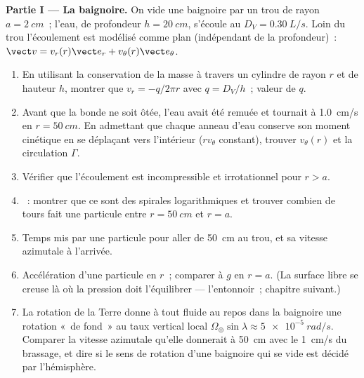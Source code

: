 \begin{problem}
\label{pb:b2:fluid-kinematics:1}

\medskip
\noindent\textbf{Partie I --- La baignoire.}
On vide une baignoire par un trou de rayon $a = \qty{2}{cm}$~; l'eau,
de profondeur $h = \qty{20}{cm}$, s'écoule au  $D_V =
\qty{0.30}{L/s}$. Loin du trou l'écoulement est modélisé comme plan
(indépendant de la profondeur)~: $\vect v = v_r(r)\vect e_r + v_\theta(r)\vect e_\theta$.
\begin{enumerate}
  \item En utilisant la conservation de la masse à travers un cylindre de rayon $r$ et
        de hauteur $h$, montrer que $v_r = -q/2\pi r$ avec $q = D_V/h$~;
        valeur de $q$.
  \item Avant que la bonde ne soit ôtée, l'eau avait été remuée et
        tournait à \qty{1.0}{cm/s} en $r = \qty{50}{cm}$. En admettant que
        chaque anneau d'eau conserve son moment cinétique en se déplaçant
        vers l'intérieur ($rv_\theta$ constant), trouver $v_\theta(r)$ et la
        circulation $\Gamma$.
  \item Vérifier que l'écoulement est incompressible et irrotationnel pour
        $r > a$.
  \item {}~: montrer que ce sont des spirales logarithmiques et trouver
        combien de tours fait une particule entre $r = \qty{50}{cm}$ et
        $r = a$.
  \item Temps mis par une particule pour aller de \qty{50}{cm} au trou, et
        sa vitesse azimutale à l'arrivée.
  \item Accélération d'une particule en $r$~; comparer à $g$ en $r = a$.
        (La surface libre se creuse là où la pression doit l'équilibrer ---
        l'entonnoir~; chapitre suivant.)
  \item La rotation de la Terre donne à tout fluide au repos dans la baignoire une
        rotation «~de fond~» au taux vertical local
        $\Omega_\oplus\sin\lambda \approx \qty{5e-5}{rad/s}$. Comparer la
        vitesse azimutale qu'elle donnerait à \qty{50}{cm} avec le
        \qty{1}{cm/s} du brassage, et dire si le sens de
        rotation d'une baignoire qui se vide est décidé par l'hémisphère.
\end{enumerate}


\end{problem}
